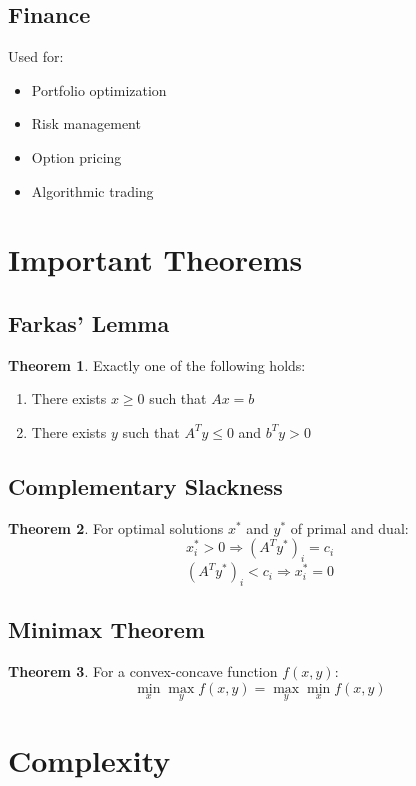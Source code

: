 \documentclass[11pt]{article}
\theoremstyle{definition}
\newtheorem{theorem}{Theorem}[section]
\begin{document}
\subsection{Finance}
Used for:
\begin{itemize}
    \item Portfolio optimization
    \item Risk management
    \item Option pricing
    \item Algorithmic trading
\end{itemize}

\section{Important Theorems}

\subsection{Farkas' Lemma}
\begin{theorem}
Exactly one of the following holds:
\begin{enumerate}
    \item There exists $x \geq 0$ such that $Ax = b$
    \item There exists $y$ such that $A^T y \leq 0$ and $b^T y > 0$
\end{enumerate}
\end{theorem}

\subsection{Complementary Slackness}
\begin{theorem}
For optimal solutions $x^*$ and $y^*$ of primal and dual:
$$x_i^* > 0 \Rightarrow (A^T y^*)_i = c_i$$
$$(A^T y^*)_i < c_i \Rightarrow x_i^* = 0$$
\end{theorem}

\subsection{Minimax Theorem}
\begin{theorem}
For a convex-concave function $f(x,y)$:
$$\min_x \max_y f(x,y) = \max_y \min_x f(x,y)$$
\end{theorem}

\section{Complexity}
\end{document}
